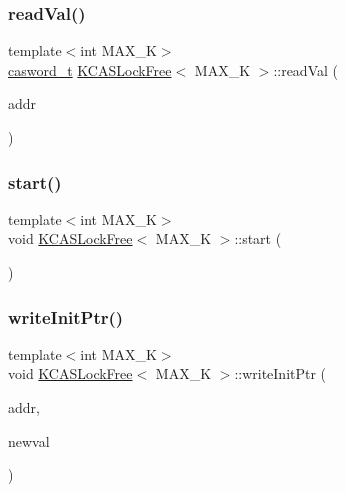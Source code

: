 \mbox{\label{classKCASLockFree_a46fecb32042ea91275aaf94592771e40}} 
\subsubsection{\texorpdfstring{read\+Val()}{readVal()}}
{\footnotesize\ttfamily template$<$int M\+A\+X\+\_\+K$>$ \\
\hyperlink{rq__unsafe_8h_ad45142aaf2ff20a036dc6242b8483e9c}{casword\+\_\+t} \hyperlink{classKCASLockFree}{K\+C\+A\+S\+Lock\+Free}$<$ M\+A\+X\+\_\+K $>$\+::read\+Val (\begin{DoxyParamCaption}\item[{\hyperlink{rq__unsafe_8h_ad45142aaf2ff20a036dc6242b8483e9c}{casword\+\_\+t} volatile $\ast$}]{addr }\end{DoxyParamCaption})}

\mbox{\label{classKCASLockFree_ae4b43c2e64326f35df2c6c90ca33f448}} 
\subsubsection{\texorpdfstring{start()}{start()}}
{\footnotesize\ttfamily template$<$int M\+A\+X\+\_\+K$>$ \\
void \hyperlink{classKCASLockFree}{K\+C\+A\+S\+Lock\+Free}$<$ M\+A\+X\+\_\+K $>$\+::start (\begin{DoxyParamCaption}{ }\end{DoxyParamCaption})}

\mbox{\label{classKCASLockFree_a4e6ea63f89337e45fe2d89903c399c23}} 
\subsubsection{\texorpdfstring{write\+Init\+Ptr()}{writeInitPtr()}}
{\footnotesize\ttfamily template$<$int M\+A\+X\+\_\+K$>$ \\
void \hyperlink{classKCASLockFree}{K\+C\+A\+S\+Lock\+Free}$<$ M\+A\+X\+\_\+K $>$\+::write\+Init\+Ptr (\begin{DoxyParamCaption}\item[{\hyperlink{rq__unsafe_8h_ad45142aaf2ff20a036dc6242b8483e9c}{casword\+\_\+t} volatile $\ast$}]{addr,  }\item[{\hyperlink{rq__unsafe_8h_ad45142aaf2ff20a036dc6242b8483e9c}{casword\+\_\+t} const}]{newval }\end{DoxyParamCaption})}

